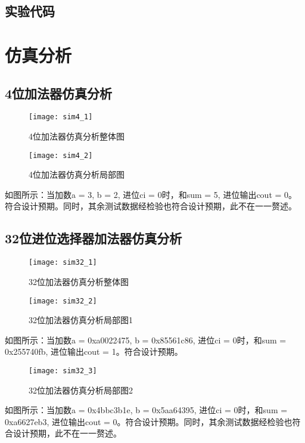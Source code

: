 \documentclass{../source/Experiment}
\begin{document}
            \subsection{实验代码}

            

            

            
        \section{仿真分析}
            \subsection{4位加法器仿真分析}
            \begin{figure}[H]
                \centering
                \texttt{[image: sim4\_1]}
                \caption{4位加法器仿真分析整体图}
            \end{figure}
            
            \begin{figure}[H]
                \centering
                \texttt{[image: sim4\_2]}
                \caption{4位加法器仿真分析局部图}
            \end{figure}
            如图所示：当加数a = 3, b = 2, 进位ci = 0时，和sum = 5, 进位输出cout = 0。符合设计预期。同时，其余测试数据经检验也符合设计预期，此不在一一赘述。
            \subsection{32位进位选择器加法器仿真分析}
            \begin{figure}[H]
                \centering
                \texttt{[image: sim32\_1]}
                \caption{32位加法器仿真分析整体图}
            \end{figure}
            \begin{figure}[H]
                \centering
                \texttt{[image: sim32\_2]}
                \caption{32位加法器仿真分析局部图1}
            \end{figure}
            如图所示：当加数a = 0xa0022475, b = 0x85561c86, 进位ci = 0时，和sum = 0x255740fb, 进位输出cout = 1。符合设计预期。
            \begin{figure}[H]
                \centering
                \texttt{[image: sim32\_3]}
                \caption{32位加法器仿真分析局部图2}
            \end{figure}
            如图所示：当加数a = 0x4bbc3b1e, b = 0x5aa64395, 进位ci = 0时，和sum = 0xa6627eb3, 进位输出cout = 0。符合设计预期。同时，其余测试数据经检验也符合设计预期，此不在一一赘述。
\end{document}
